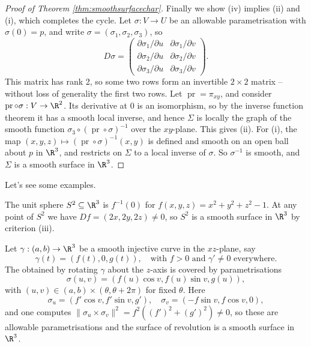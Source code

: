 \begin{proof}[Proof of Theorem \ref{thm:smoothsurfacechar}]
    Finally we show (iv) implies (ii) and (i), which completes the cycle. Let $\sigma: V \rightarrow U$ be an allowable parametrisation with $\sigma(0) = p$, and write $\sigma = (\sigma_1, \sigma_2, \sigma_3)$, so
    $$
    D \sigma = \begin{pmatrix}
        \partial \sigma_1/\partial u & \partial \sigma_1/\partial v \\
        \partial \sigma_2/\partial u & \partial \sigma_2/\partial v \\
        \partial \sigma_3/\partial u & \partial \sigma_3/\partial v
    \end{pmatrix}.
    $$
    This matrix has rank 2, so some two rows form an invertible $2 \times 2$ matrix -- without loss of generality the first two rows. Let $\operatorname{pr} = \pi_{xy}$, and consider $\operatorname{pr} \circ \sigma: V \rightarrow \R^2$. Its derivative at $0$ is an isomorphism, so by the inverse function theorem it has a smooth local inverse, and hence $\Sigma$ is locally the graph of the smooth function $\sigma_3 \circ (\operatorname{pr} \circ \sigma)^{-1}$ over the $xy$-plane. This gives (ii). For (i), the map $(x, y, z) \mapsto (\operatorname{pr} \circ \sigma)^{-1}(x, y)$ is defined and smooth on an open ball about $p$ in $\R^3$, and restricts on $\Sigma$ to a local inverse of $\sigma$. So $\sigma^{-1}$ is smooth, and $\Sigma$ is a smooth surface in $\R^3$.
\end{proof}

Let's see some examples.

\begin{example}
    The unit sphere $S^2 \subseteq \R^3$ is $f^{-1}(0)$ for $f(x, y, z) = x^2 + y^2 + z^2 - 1$. At any point of $S^2$ we have $Df = (2x, 2y, 2z) \neq 0$, so $S^2$ is a smooth surface in $\R^3$ by criterion (iii).
\end{example}

\begin{example}
    Let $\gamma: (a, b) \rightarrow \R^3$ be a smooth injective curve in the $xz$-plane, say
    $$
    \gamma(t) = (f(t), 0, g(t)), \quad \text{with } f > 0 \text{ and } \gamma' \neq 0 \text{ everywhere}.
    $$
    The  obtained by rotating $\gamma$ about the $z$-axis is covered by parametrisations
    $$
    \sigma(u, v) = (f(u) \cos v, f(u) \sin v, g(u)),
    $$
    with $(u, v) \in (a, b) \times (\theta, \theta + 2\pi)$ for fixed $\theta$. Here
    $$
    \sigma_u = (f' \cos v, f' \sin v, g'), \quad \sigma_v = (-f \sin v, f \cos v, 0),
    $$
    and one computes $\|\sigma_u \times \sigma_v\|^2 = f^2 ((f')^2 + (g')^2) \neq 0$, so these are allowable parametrisations and the surface of revolution is a smooth surface in $\R^3$.
\end{example}

